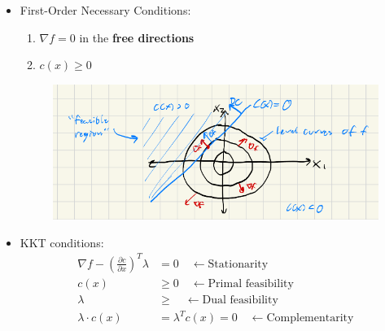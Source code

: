 \documentclass[11pt]{article}
\begin{document}
\begin{itemize}
    \item First-Order Necessary Conditions:
    \begin{enumerate}
        \item $\nabla f = 0$ in the \textbf{free directions}
        \item $c(x) \geq 0$
    \end{enumerate}
    \begin{figure}[H]
        \centering
        \includegraphics[width=0.7\linewidth]{lecture_4_2.png}
    \end{figure}
    \item KKT conditions:
    \begin{align*}
        \nabla f - \left(\frac{\partial c}{\partial x}\right)^T\lambda &= 0 \quad \leftarrow\text{Stationarity}
        \\
        c(x) &\geq 0 \quad \leftarrow\text{Primal feasibility}
        \\
        \lambda &\geq \quad \leftarrow\text{Dual feasibility}
        \\
        \lambda \cdot c(x) &= \lambda^T c(x) =0 \quad \leftarrow\text{Complementarity}
    \end{align*}
\end{itemize}
\end{document}
